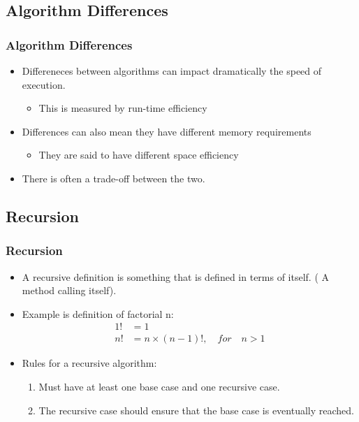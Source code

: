 \documentclass{beamer}
\begin{document}
\subsection{Algorithm Differences}
\begin{frame}
\frametitle{Algorithm Differences}
\begin{itemize}
\item Differeneces between algorithms can impact dramatically the speed of execution.
\begin{itemize}
\item This is measured by {\color{red} run-time efficiency}
\end{itemize}
\item Differences can also mean they have different memory requirements
\begin{itemize}
\item They are said to have different {\color{green} space efficiency}
\end{itemize}
\item There is often a trade-off between the two.
\end{itemize}
\end{frame}

\subsection{Recursion}
\begin{frame}
\frametitle{Recursion}
\begin{itemize}
\item A recursive definition is something that is defined in terms of itself. ({\color{green} A method calling itself}).
\item Example is definition of factorial n:
\begin{equation}
\begin{split}
1! & = 1 \\
n! & = n \times (n - 1)!,\quad for \quad n > 1
\end{split}
\end{equation}
\item Rules for a recursive algorithm:
\begin{enumerate}
\item Must have at least one {\color{red} base case} and one {\color{purple} recursive case}.
\item The {\color{purple}recursive case} should ensure that the {\color{red} base case} is eventually reached.
\end{enumerate}
\end{itemize}
\end{frame}
\end{document}
